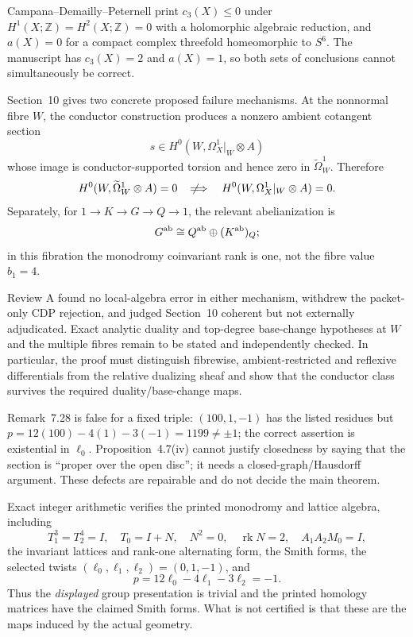 \vspace{3pt}
{\fontsize{7.45pt}{8.45pt}\selectfont
\noindent\begin{minipage}[t]{0.492\textwidth}
\vspace{0pt}
Campana--Demailly--Peternell print $c_3(X)\leq0$ under $H^1(X;\mathbb Z)=H^2(X;\mathbb Z)=0$ with a holomorphic algebraic reduction, and $a(X)=0$ for a compact complex threefold homeomorphic to $S^6$. The manuscript has $c_3(X)=2$ and $a(X)=1$, so both sets of conclusions cannot simultaneously be correct.

Section~10 gives two concrete proposed failure mechanisms. At the nonnormal fibre $W$, the conductor construction produces a nonzero ambient cotangent section
\[
s\in H^0\!\left(W,\Omega_X^1|_W\otimes A\right)
\]
whose image is conductor-supported torsion and hence zero in $\widetilde\Omega_W^1$. Therefore
\[
H^0(W,\widetilde\Omega_W^1\otimes A)=0
\quad\not\!\Longrightarrow\quad
H^0(W,\Omega_X^1|_W\otimes A)=0.
\]
Separately, for $1\to K\to G\to Q\to1$, the relevant abelianization is
\[
G^{\rm ab}\cong Q^{\rm ab}\oplus(K^{\rm ab})_Q;
\]
in this fibration the monodromy coinvariant rank is one, not the fibre value $b_1=4$.

Review A found no local-algebra error in either mechanism, withdrew the packet-only CDP rejection, and judged Section~10 coherent but not externally adjudicated. Exact analytic duality and top-degree base-change hypotheses at $W$ and the multiple fibres remain to be stated and independently checked. In particular, the proof must distinguish fibrewise, ambient-restricted and reflexive differentials from the relative dualizing sheaf and show that the conductor class survives the required duality/base-change maps.

Remark~7.28 is false for a fixed triple: $(100,1,-1)$ has the listed residues but
$p=12(100)-4(1)-3(-1)=1199\ne\pm1$; the correct assertion is existential in $\ell_0$. Proposition~4.7(iv) cannot justify closedness by saying that the section is ``proper over the open disc''; it needs a closed-graph/Hausdorff argument. These defects are repairable and do not decide the main theorem.
\end{minipage}\hfill
\begin{minipage}[t]{0.478\textwidth}
\vspace{0pt}
Exact integer arithmetic verifies the printed monodromy and lattice algebra, including
\[
T_1^3=T_2^4=I,\quad T_0=I+N,\quad N^2=0,
\quad\operatorname{rk}N=2,\quad A_1A_2M_0=I,
\]
the invariant lattices and rank-one alternating form, the Smith forms, the selected twists $(\ell_0,\ell_1,\ell_2)=(0,1,-1)$, and
\[
p=12\ell_0-4\ell_1-3\ell_2=-1.
\]
Thus the \emph{displayed} group presentation is trivial and the printed homology matrices have the claimed Smith forms. What is not certified is that these are the maps induced by the actual geometry.


\end{minipage}}
